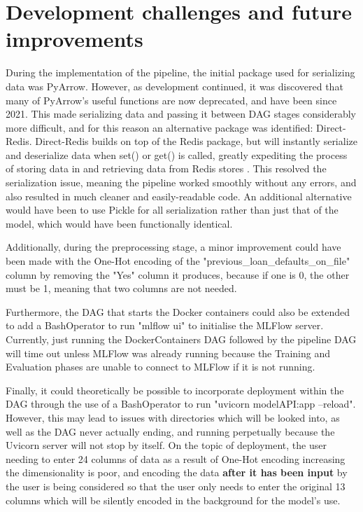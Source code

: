 \documentclass[12pt]{report}
\newcommand{\para}{\vspace{7pt}\noindent}
\begin{document}
\section{Development challenges and future improvements}
During the implementation of the pipeline, the initial package used for serializing data was PyArrow.
However, as development continued, it was discovered that many of PyArrow's useful functions are now 
deprecated, and have been since 2021. This made serializing data and passing it between DAG stages considerably more difficult, 
and for this reason an alternative package was identified: Direct-Redis. Direct-Redis builds on top of the Redis 
package, but will instantly serialize and deserialize data when set() or get() is called, greatly expediting 
the process of storing data in and retrieving data from Redis stores \autocite{direct-redis_direct-redis_nodate}.
This resolved the serialization issue, meaning the pipeline worked smoothly without any errors, and also 
resulted in much cleaner and easily-readable code. An additional alternative would have been to 
use Pickle for all serialization rather than just that of the model, which would have been functionally identical.

\para Additionally, during the preprocessing stage, a minor improvement could have been made with the One-Hot 
encoding of the "previous\_loan\_defaults\_on\_file" column by removing the "Yes" column it produces, because 
if one is 0, the other must be 1, meaning that two columns are not needed.

\para Furthermore, the DAG that starts the Docker containers could also be extended to add a BashOperator to run 
"mlflow ui" to initialise the MLFlow server. Currently, just running the DockerContainers DAG followed by the pipeline DAG will 
time out unless MLFlow was already running because the Training and Evaluation phases are unable to connect to MLFlow 
if it is not running.

\para Finally, it could theoretically be possible to incorporate deployment within the DAG through the use of a 
BashOperator to run "uvicorn modelAPI:app --reload". However, this may lead to issues with directories which will be 
looked into, as well as the DAG never actually ending, and running perpetually because the Uvicorn server will not stop 
by itself. On the topic of deployment, the user needing to enter 24 columns of data as a result of One-Hot encoding 
increasing the dimensionality is poor, and encoding the data \textbf{after it has been input} by the user is being considered so 
that the user only needs to enter the original 13 columns which will be silently encoded in the background for the model's use.
\end{document}

